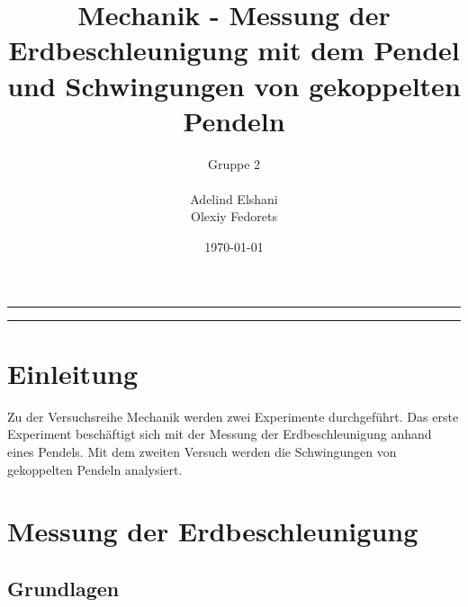 \documentclass[a4paper, 11pt]{article}
\title{Mechanik - Messung der Erdbeschleunigung mit dem Pendel und Schwingungen von gekoppelten Pendeln}
\author{Gruppe 2 \\ \\ Adelind Elshani \\ Olexiy Fedorets}
\date{\today}
\begin{document}
\begin{titlepage}
	\vspace*{\fill}
	\begin{center}
		\textheight
		\vfill
		\newcommand{\Line}{\rule{\linewidth}{0.6mm}}
		\Line 
		{\let\newpage\relax\maketitle}
		\Line 
		\vfill
	\end{center}
	\vspace*{\fill}
	\thispagestyle{empty}
\end{titlepage}





\newpage
\thispagestyle{empty}
\tableofcontents
\newpage

\pagestyle{fancy}
\fancyhf{}
\fancyhead[L]{\nouppercase{\leftmark}}
\fancyhead[R]{\thepage}
\renewcommand{\headrulewidth}{0.5pt}
\fancyfoot[C]{\thepage}


\setcounter{page}{1}

\section{Einleitung}
Zu der Versuchsreihe Mechanik werden zwei Experimente durchgeführt. Das erste Experiment beschäftigt sich mit der Messung der Erdbeschleunigung anhand eines Pendels. Mit dem zweiten Versuch werden die Schwingungen von gekoppelten Pendeln analysiert.  


\section{Messung der Erdbeschleunigung}

\subsection{Grundlagen} 
\end{document}
